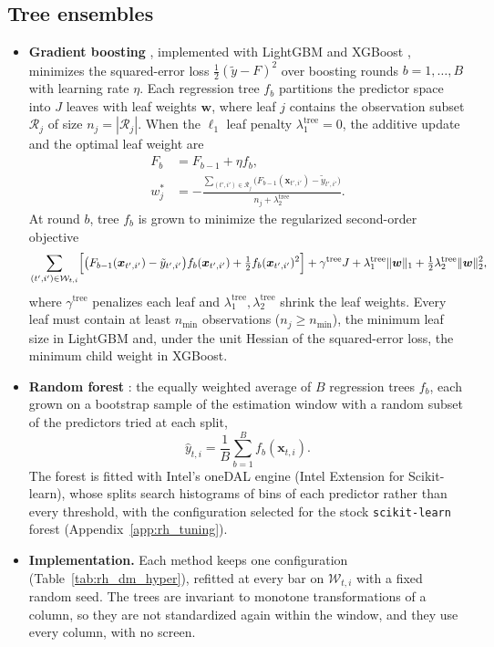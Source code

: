 \subsection{Tree ensembles}
\label{app:rh_methods_trees}
\begin{itemize}
\item \textbf{Gradient boosting} \citep{Friedman2001}, implemented with LightGBM \citep{Ke2017} and XGBoost
  \citep{Chen2016}, minimizes the squared-error loss $\tfrac12 (\tilde y - F)^2$ over boosting rounds $b = 1, \dots, B$
  with learning rate $\eta$. Each regression tree $f_b$ partitions the predictor space into $J$ leaves with leaf weights
  $\bm w$, where leaf $j$ contains the observation subset $\mathcal R_j$ of size $n_j = |\mathcal R_j|$. When the
  $\ell_1$ leaf penalty $\lambda_1^{\mathrm{tree}} = 0$, the additive update and the optimal leaf weight are
  \begin{align*}
    F_b &= F_{b-1} + \eta f_b, \\
    w_j^\ast &= -\frac{\sum_{(t',i') \in \mathcal R_j}\bigl(F_{b-1}(\bm x_{t',i'}) - \tilde y_{t',i'}\bigr)}
      {n_j + \lambda_2^{\mathrm{tree}}} .
  \end{align*}
  At round $b$, tree $f_b$ is grown to minimize the regularized second-order objective
  \[
    \sum_{(t',i') \in \mathcal W_{t,i}} \Bigl[\bigl(F_{b-1}(\bm x_{t',i'}) - \tilde y_{t',i'}\bigr)
      f_b(\bm x_{t',i'}) + \tfrac12 f_b(\bm x_{t',i'})^2\Bigr]
    + \gamma^{\mathrm{tree}} J + \lambda_1^{\mathrm{tree}} \lVert \bm w \rVert_1
    + \tfrac12 \lambda_2^{\mathrm{tree}} \lVert \bm w \rVert_2^2 ,
  \]
  where $\gamma^{\mathrm{tree}}$ penalizes each leaf and $\lambda_1^{\mathrm{tree}}, \lambda_2^{\mathrm{tree}}$
  shrink the leaf weights. Every leaf must contain at least $n_{\min}$ observations ($n_j \ge n_{\min}$), the minimum
  leaf size in LightGBM and, under the unit Hessian of the squared-error loss, the minimum child weight in XGBoost.
\item \textbf{Random forest} \citep{Breiman2001}: the equally weighted average of $B$ regression trees $f_b$, each
  grown on a bootstrap sample of the estimation window with a random subset of the predictors tried at each split,
  \[
    \hat y_{t,i} = \frac1B \sum_{b=1}^{B} f_b(\bm x_{t,i}).
  \]
  The forest is fitted with Intel's oneDAL engine (Intel Extension for Scikit-learn), whose splits search histograms of
  \rhtuRfBins{} bins of each predictor rather than every threshold, %
  with the configuration selected for the stock \texttt{scikit-learn} forest (Appendix~\ref{app:rh_tuning}).
\item \textbf{Implementation.} Each method keeps one configuration (Table~\ref{tab:rh_dm_hyper}), refitted at every bar
  on $\mathcal W_{t,i}$ with a fixed random seed. The trees are invariant to monotone transformations of a column, so
  they are not standardized again within the window, and they use every column, with no screen.
\end{itemize}
